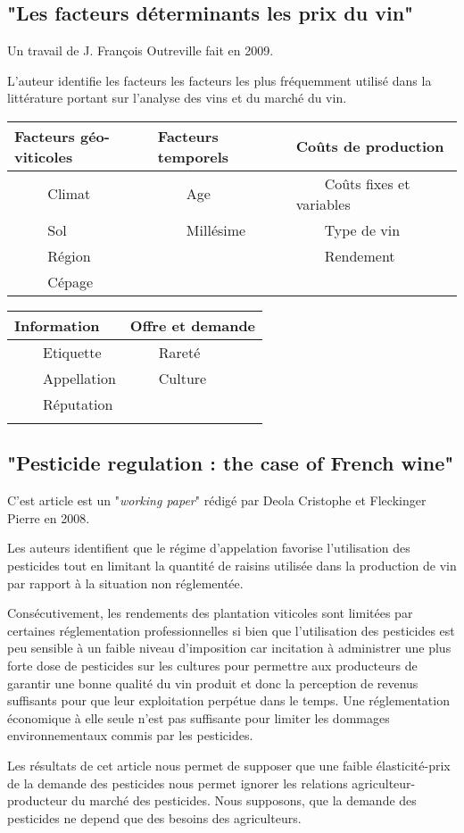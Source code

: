 \documentclass[11pt, a4paper]{article}
\begin{document}
\subsection*{"Les facteurs déterminants les prix du vin"}
Un travail de J. François Outreville fait en 2009.
\par
L'auteur identifie les facteurs les facteurs les plus fréquemment utilisé dans la littérature portant sur l'analyse des vins et du marché du vin.
\begin{center}
\begin{tabular}{l|l|l}
    \hline
    \hline
    Facteurs géo-viticoles & Facteurs temporels & Coûts de production \\
    \hline
    ~~~~ Climat & ~~~~Age & ~~~~Coûts fixes et variables \\
    ~~~~ Sol & ~~~~Millésime & ~~~~Type de vin \\
    ~~~~ Région & & ~~~~Rendement \\
    ~~~~ Cépage & & \\
    \hline
\end{tabular}
\par
\begin{tabular}{l|l}
    \hline
    \hline
    Information & Offre et demande \\
    \hline
    ~~~~Etiquette & ~~~~Rareté \\
    ~~~~Appellation & ~~~~Culture \\
    ~~~~Réputation & \\
    & \\
    \hline
\end{tabular}
\end{center}

\subsection*{"Pesticide regulation : the case of French wine"}
C'est article est un "\textit{working paper}" rédigé par Deola Cristophe et Fleckinger Pierre en 2008.
\par
Les auteurs identifient que le régime d’appelation favorise l’utilisation des pesticides tout en limitant la quantité de raisins utilisée dans la production de vin par rapport à la situation non réglementée. 
\par
Consécutivement, les rendements des plantation viticoles sont limitées par certaines réglementation professionnelles si bien que l’utilisation des pesticides est peu sensible à un faible niveau d’imposition car incitation à administrer une plus forte dose de pesticides sur les cultures pour permettre aux producteurs de garantir une bonne qualité du vin produit et donc la perception de revenus suffisants pour que leur exploitation perpétue dans le temps. 
Une réglementation économique à elle seule n’est pas suffisante pour limiter les dommages environnementaux commis par les pesticides.
\par
Les résultats de cet article nous permet de supposer que une faible élasticité-prix de la demande des pesticides nous permet ignorer les relations agriculteur-producteur du marché des pesticides.
Nous supposons, que la demande des pesticides ne depend que des besoins des agriculteurs.
\end{document}
